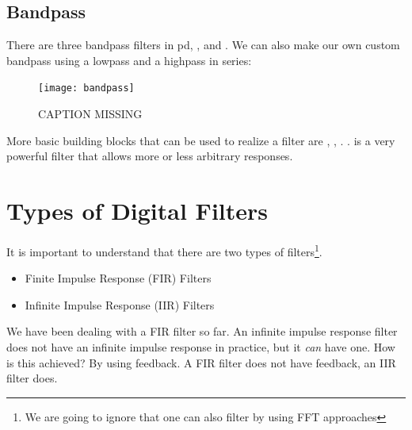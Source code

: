 \subsection{Bandpass} %
There are three bandpass filters in pd, ,  and .
We can also make our own custom bandpass using a lowpass and a highpass in series:
\begin{figure}[H]
	\centering
	\texttt{[image: bandpass]}
	\caption[bandpass]
	{CAPTION MISSING}
	\label{fig:label}
\end{figure}




More basic building blocks that can be used to realize a filter are , , . .  is a very powerful filter that allows more or less arbitrary responses.\\

\section{Types of Digital Filters}

It is important to understand that there are two types of filters\footnote{We are going to ignore that one can also filter by using FFT approaches}.
\begin{itemize}
	\item Finite Impulse Response (FIR) Filters
	\item Infinite Impulse Response (IIR) Filters
\end{itemize}

We have been dealing with a FIR filter so far. An infinite impulse response filter does not have an infinite impulse response in practice, but it \textit{can} have one. How is this achieved? By using feedback. A FIR filter does not have feedback, an IIR filter does.


